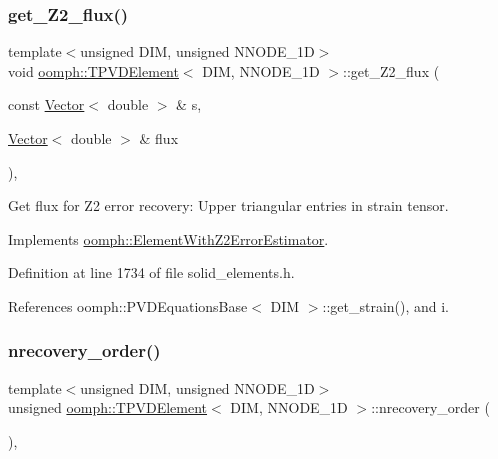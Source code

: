 \subsubsection{\texorpdfstring{get\+\_\+\+Z2\+\_\+flux()}{get\_Z2\_flux()}}
{\footnotesize\ttfamily template$<$unsigned D\+IM, unsigned N\+N\+O\+D\+E\+\_\+1D$>$ \\
void \hyperlink{classoomph_1_1TPVDElement}{oomph\+::\+T\+P\+V\+D\+Element}$<$ D\+IM, N\+N\+O\+D\+E\+\_\+1D $>$\+::get\+\_\+\+Z2\+\_\+flux (\begin{DoxyParamCaption}\item[{const \hyperlink{classoomph_1_1Vector}{Vector}$<$ double $>$ \&}]{s,  }\item[{\hyperlink{classoomph_1_1Vector}{Vector}$<$ double $>$ \&}]{flux }\end{DoxyParamCaption})\hspace{0.3cm}{\ttfamily [inline]}, {\ttfamily [virtual]}}



Get \textquotesingle{}flux\textquotesingle{} for Z2 error recovery\+: Upper triangular entries in strain tensor. 



Implements \hyperlink{classoomph_1_1ElementWithZ2ErrorEstimator_a5688ff5f546d81771cabad82ca5a7556}{oomph\+::\+Element\+With\+Z2\+Error\+Estimator}.



Definition at line 1734 of file solid\+\_\+elements.\+h.



References oomph\+::\+P\+V\+D\+Equations\+Base$<$ D\+I\+M $>$\+::get\+\_\+strain(), and i.

\mbox{\label{classoomph_1_1TPVDElement_a85176c5881f61e045e9783460ca0064f}} 
\subsubsection{\texorpdfstring{nrecovery\+\_\+order()}{nrecovery\_order()}}
{\footnotesize\ttfamily template$<$unsigned D\+IM, unsigned N\+N\+O\+D\+E\+\_\+1D$>$ \\
unsigned \hyperlink{classoomph_1_1TPVDElement}{oomph\+::\+T\+P\+V\+D\+Element}$<$ D\+IM, N\+N\+O\+D\+E\+\_\+1D $>$\+::nrecovery\+\_\+order (\begin{DoxyParamCaption}{ }\end{DoxyParamCaption})\hspace{0.3cm}{\ttfamily [inline]}, {\ttfamily [virtual]}}



